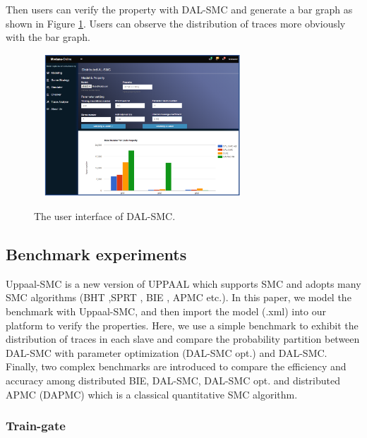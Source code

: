 Then users can verify the property with DAL-SMC and generate a bar graph as shown in Figure \ref{ui_dsmc}. Users can observe the distribution of traces more obviously with the bar graph.
\begin{figure}[htbp]
	\centering
	{\includegraphics[width=3.2in,height=2.1in]{fig/system.png}}
	\caption{The user interface of DAL-SMC.}\label{ui_dsmc}
\end{figure}

\subsection{Benchmark experiments}
Uppaal-SMC \cite{Bulychev2012UPPAAL} is a new version of UPPAAL which supports SMC and adopts many SMC algorithms (BHT \cite{jha2009bayesian},SPRT \cite{younes2006statistical}, BIE \cite{zuliani2013bayesian}, APMC \cite{herault2004approximate} etc.). In this paper, we model the benchmark with Uppaal-SMC, and then import the model (.xml) into our platform to verify the properties. Here, we use a simple benchmark to exhibit the distribution of traces in each slave and compare the probability partition between DAL-SMC with parameter optimization (DAL-SMC opt.) and DAL-SMC. Finally, two complex benchmarks are introduced to compare the efficiency and accuracy among distributed BIE, DAL-SMC, DAL-SMC opt. and distributed APMC (DAPMC) which is a classical quantitative SMC algorithm.

\subsubsection{Train-gate}

